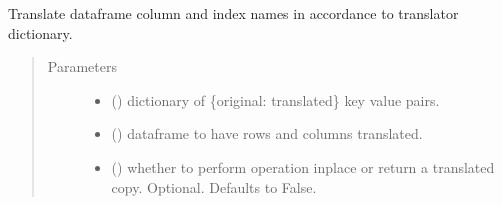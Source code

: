 \documentclass[letterpaper,10pt,english]{sphinxmanual}
\begin{document}
\begin{fulllineitems}
\label{\detokenize{dalio.util:dalio.util.translate_df}}
Translate dataframe column and index names in accordance to translator
dictionary.
\begin{quote}\begin{description}
\item[{Parameters}] \leavevmode\begin{itemize}
\item {} 
 () \textendash{} dictionary of \{original: translated\} key value
pairs.

\item {} 
 () \textendash{} dataframe to have rows and columns translated.

\item {} 
 () \textendash{} whether to perform operation inplace or return a
translated copy. Optional. Defaults to False.

\end{itemize}

\end{description}\end{quote}

\end{fulllineitems}

\end{document}
